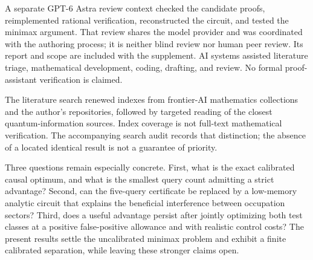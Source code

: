 \documentclass[11pt,a4paper]{article}
\theoremstyle{remark}
\begin{document}
A separate GPT-6 Astra review context checked the candidate proofs,
reimplemented rational verification, reconstructed the circuit, and
tested the minimax argument. That review shares the model provider and
was coordinated with the authoring process; it is neither blind review
nor human peer review. Its report and scope are included with the
supplement. AI systems assisted literature triage, mathematical
development, coding, drafting, and review. No formal proof-assistant
verification is claimed.

The literature search renewed indexes from frontier-AI mathematics
collections and the author's repositories, followed by targeted reading
of the closest quantum-information sources. Index coverage is not
full-text mathematical verification. The accompanying search audit
records that distinction; the absence of a located identical result is
not a guarantee of priority.

Three questions remain especially concrete. First, what is the exact
calibrated causal optimum, and what is the smallest query count admitting
a strict advantage? Second, can the five-query certificate be replaced
by a low-memory analytic circuit that explains the beneficial
interference between occupation sectors? Third, does a useful advantage
persist after jointly optimizing both test classes at a positive
false-positive allowance and with realistic control costs?
The present results settle the uncalibrated minimax problem and exhibit
a finite calibrated separation, while leaving these stronger claims open.
\end{document}
